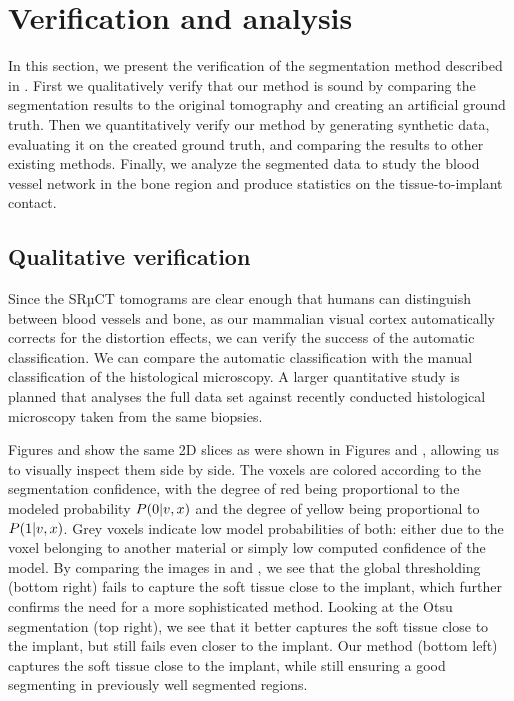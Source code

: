 \section{Verification and analysis}
\label{sec:verification}

In this section, we present the verification of the segmentation method
described in . First we qualitatively verify that our method
is sound by comparing the segmentation results to the original tomography and
creating an artificial ground truth. Then we quantitatively verify our method
by generating synthetic data, evaluating it on the created ground truth, and
comparing the results to other existing methods. Finally, we analyze the
segmented data to study the blood vessel network in the bone region and produce
statistics on the tissue-to-implant contact.

\subsection{Qualitative verification}

Since the SRµCT tomograms are clear enough that humans can distinguish between
blood vessels and bone, as our mammalian visual cortex automatically corrects
for the distortion effects, we can verify the success of the automatic
classification. We can compare the automatic classification with the manual
classification of the histological microscopy. A larger quantitative study is
planned that analyses the full data set against recently conducted histological
microscopy taken from the same biopsies.

Figures  and 
show the same 2D slices as were shown in Figures  and
, allowing us to visually inspect them side by side. The
voxels are colored according to the segmentation confidence, with the degree of
red being proportional to the modeled probability $P\!\left(0\middle\vert v,x\right)$ and the
degree of yellow being proportional to $P\!\left(1\middle\vert v,x\right)$. Grey voxels indicate
low model probabilities of both: either due to the voxel belonging to another
material or simply low computed confidence of the model.  By comparing the
images in  and
, we see that the global thresholding (bottom
right) fails to capture the soft tissue close to the implant, which further
confirms the need for a more sophisticated method. Looking at the Otsu
segmentation (top right), we see that it better captures the soft tissue close
to the implant, but still fails even closer to the implant. Our method (bottom
left) captures the soft tissue close to the implant, while still ensuring a
good segmenting in previously well segmented regions.

